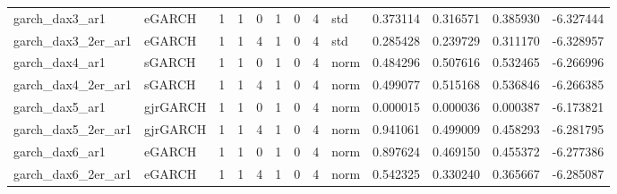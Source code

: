 \documentclass[
  11pt,
]{article}
\newenvironment{Shaded}{\begin{snugshade}}{\end{snugshade}}
\newcommand{\CommentTok}[1]{\textcolor[rgb]{0.56,0.35,0.01}{\textit{#1}}}
\newcommand{\DataTypeTok}[1]{\textcolor[rgb]{0.13,0.29,0.53}{#1}}
\newcommand{\DecValTok}[1]{\textcolor[rgb]{0.00,0.00,0.81}{#1}}
\newcommand{\FloatTok}[1]{\textcolor[rgb]{0.00,0.00,0.81}{#1}}
\newcommand{\KeywordTok}[1]{\textcolor[rgb]{0.13,0.29,0.53}{\textbf{#1}}}
\newcommand{\NormalTok}[1]{#1}
\newcommand{\OperatorTok}[1]{\textcolor[rgb]{0.81,0.36,0.00}{\textbf{#1}}}
\newcommand{\OtherTok}[1]{\textcolor[rgb]{0.56,0.35,0.01}{#1}}
\newcommand{\StringTok}[1]{\textcolor[rgb]{0.31,0.60,0.02}{#1}}
\begin{document}
\begin{table}
\begin{tabular}[t]{llrrrrrrlrrrr}
garch\_dax3\_ar1 & eGARCH & 1 & 1 & 0 & 1 & 0 & 4 & std & 0.373114 & 0.316571 & 0.385930 & -6.327444\\
garch\_dax3\_2er\_ar1 & eGARCH & 1 & 1 & 4 & 1 & 0 & 4 & std & 0.285428 & 0.239729 & 0.311170 & -6.328957\\
garch\_dax4\_ar1 & sGARCH & 1 & 1 & 0 & 1 & 0 & 4 & norm & 0.484296 & 0.507616 & 0.532465 & -6.266996\\
garch\_dax4\_2er\_ar1 & sGARCH & 1 & 1 & 4 & 1 & 0 & 4 & norm & 0.499077 & 0.515168 & 0.536846 & -6.266385\\
\addlinespace
garch\_dax5\_ar1 & gjrGARCH & 1 & 1 & 0 & 1 & 0 & 4 & norm & 0.000015 & 0.000036 & 0.000387 & -6.173821\\
garch\_dax5\_2er\_ar1 & gjrGARCH & 1 & 1 & 4 & 1 & 0 & 4 & norm & 0.941061 & 0.499009 & 0.458293 & -6.281795\\
garch\_dax6\_ar1 & eGARCH & 1 & 1 & 0 & 1 & 0 & 4 & norm & 0.897624 & 0.469150 & 0.455372 & -6.277386\\
garch\_dax6\_2er\_ar1 & eGARCH & 1 & 1 & 4 & 1 & 0 & 4 & norm & 0.542325 & 0.330240 & 0.365667 & -6.285087\\
\bottomrule
\end{tabular}
\end{table}

\begin{Shaded}
\end{Shaded}
\end{document}
